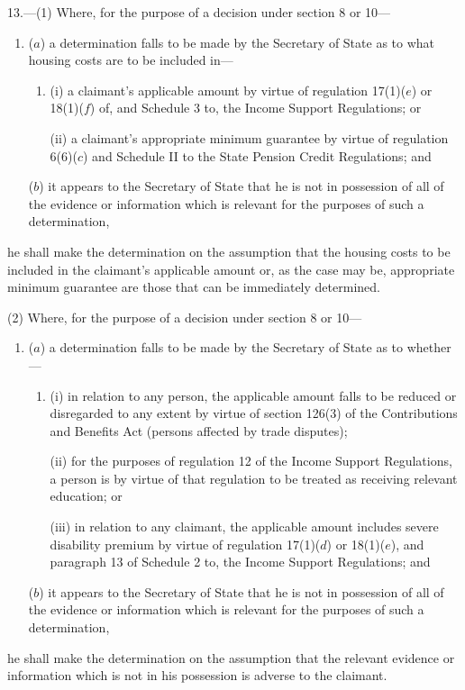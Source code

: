 \documentclass[12pt,a4paper]{article}
\begin{document}
13.—(1) Where, for the purpose of a decision under section 8 or 10—
\begin{enumerate}\item[]

($a$) a determination falls to be made by the Secretary of State as to what housing costs are to be included in—
\begin{enumerate}\item[]
(i) a claimant’s applicable amount by virtue of regulation 17(1)($e$)  or 18(1)($f$)  of, and Schedule 3 to, the Income Support Regulations; or

(ii) a claimant’s appropriate minimum guarantee by virtue of regulation 6(6)($c$)  and Schedule II to the State Pension Credit Regulations; and
\end{enumerate}

($b$) it appears to the Secretary of State that he is not in possession of all of the evidence or information which is relevant for the purposes of such a determination,
\end{enumerate}
he shall make the determination on the assumption that the housing costs to be included in the claimant’s 
applicable amount or, as the case may be, appropriate minimum guarantee are those  %
that can be immediately determined.

(2) Where, for the purpose of a decision under section 8 or 10—
\begin{enumerate}\item[]
($a$) a determination falls to be made by the Secretary of State as to whether—
\begin{enumerate}\item[]
(i) in relation to any person, the applicable amount falls to be reduced or disregarded to any extent by virtue of section 126(3) of the Contributions and Benefits Act (persons affected by trade disputes);

(ii) for the purposes of regulation 12 of the Income Support Regulations, a person is by virtue of that regulation to be treated as receiving relevant education; or

(iii) in relation to any claimant, the applicable amount includes severe disability premium by virtue of regulation 17(1)($d$) or 18(1)($e$), and paragraph 13 of Schedule 2 to, the Income Support Regulations; and
\end{enumerate}

($b$) it appears to the Secretary of State that he is not in possession of all of the evidence or information which is relevant for the purposes of such a determination,
\end{enumerate}
he shall make the determination on the assumption that the relevant evidence or information which is not in his possession is adverse to the claimant.
\end{document}
